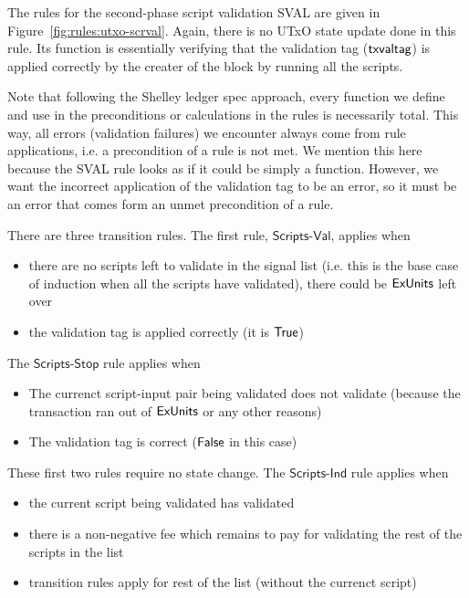 The rules for the second-phase script validation SVAL are given in
Figure~\ref{fig:rules:utxo-scrval}. Again, there is no UTxO state update
done in this rule. Its function is essentially verifying that the
validation tag ($\mathsf{txvaltag}$) is applied correctly by the creater of
the block by running all the scripts.

Note that following the Shelley ledger spec approach, every function
we define and use in the preconditions or calculations in the rules is
necessarily total.
This way, all errors (validation failures) we encounter always come from
rule applications, i.e. a precondition of a rule is not met.
We mention this here because the SVAL rule looks as if it could be
simply a function. However, we want the incorrect application of the
validation tag to be an error, so it must be an error that comes form
an unmet precondition of a rule.

There are three transition rules.
The first rule, $\mathsf{Scripts\mbox{-}Val}$, applies when

\begin{itemize}
\item there
are no scripts left to validate in the signal list (i.e. this is the base case of
induction when all the scripts have validated), there could be $\mathsf{ExUnits}$ left over
\item the validation tag is applied correctly (it is $\mathsf{True}$)
\end{itemize}

The $\mathsf{Scripts\mbox{-}Stop}$ rule applies when

\begin{itemize}
  \item The currenct script-input pair being validated does not validate
  (because the transaction ran out of $\mathsf{ExUnits}$ or any other reasons)
  \item The validation tag is correct ($\mathsf{False}$ in this case)
\end{itemize}

These first two rules require no state change.
The $\mathsf{Scripts\mbox{-}Ind}$ rule applies when

\begin{itemize}
  \item the current script being validated has validated
  \item there is a non-negative fee which remains to pay for validating
  the rest of the scripts in the list
  \item transition rules apply for rest of the list (without the currenct script)
\end{itemize}

